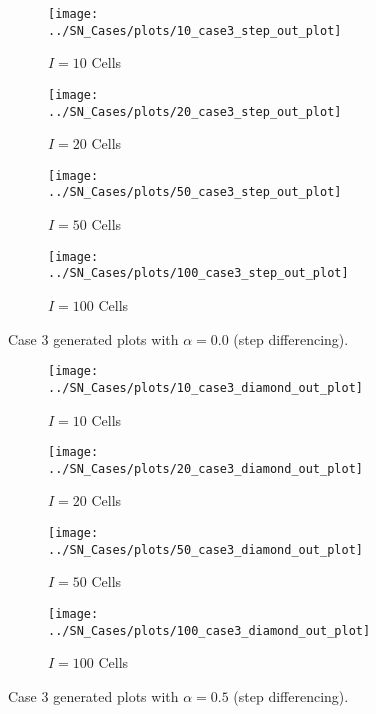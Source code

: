 \documentclass{NE515}
\theoremstyle{definition}
\begin{document}
    \begin{figure}
        \centering
        \begin{subfigure}{0.45\linewidth}
            \centering
            \texttt{[image: ../SN\_Cases/plots/10\_case3\_step\_out\_plot]}
            \caption{$I=10$ Cells}
        \end{subfigure}
        \hfill
        \begin{subfigure}{0.45\linewidth}
            \centering
            \texttt{[image: ../SN\_Cases/plots/20\_case3\_step\_out\_plot]}
            \caption{$I=20$ Cells}
        \end{subfigure}
        \hfill
        \begin{subfigure}{0.45\linewidth}
            \centering
            \texttt{[image: ../SN\_Cases/plots/50\_case3\_step\_out\_plot]}
            \caption{$I=50$ Cells}
        \end{subfigure}
        \hfill
        \begin{subfigure}{0.45\linewidth}
            \centering
            \texttt{[image: ../SN\_Cases/plots/100\_case3\_step\_out\_plot]}
            \caption{$I=100$ Cells}
        \end{subfigure}

        \caption{Case 3 generated plots with $\alpha = 0.0$ (step differencing).}
        \label{fig:case-3-step}
    \end{figure}


    \begin{figure}
        \centering
        \begin{subfigure}{0.45\linewidth}
            \centering
            \texttt{[image: ../SN\_Cases/plots/10\_case3\_diamond\_out\_plot]}
            \caption{$I=10$ Cells}
        \end{subfigure}
        \hfill
        \begin{subfigure}{0.45\linewidth}
            \centering
            \texttt{[image: ../SN\_Cases/plots/20\_case3\_diamond\_out\_plot]}
            \caption{$I=20$ Cells}
        \end{subfigure}
        \hfill
        \begin{subfigure}{0.45\linewidth}
            \centering
            \texttt{[image: ../SN\_Cases/plots/50\_case3\_diamond\_out\_plot]}
            \caption{$I=50$ Cells}
        \end{subfigure}
        \hfill
        \begin{subfigure}{0.45\linewidth}
            \centering
            \texttt{[image: ../SN\_Cases/plots/100\_case3\_diamond\_out\_plot]}
            \caption{$I=100$ Cells}
        \end{subfigure}

        \caption{Case 3 generated plots with $\alpha = 0.5$ (step differencing).}
        \label{fig:case-3-diamond}
    \end{figure}
    \clearpage
\end{document}
